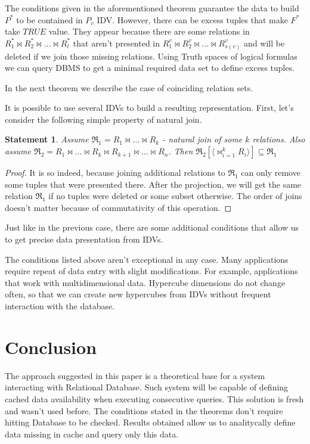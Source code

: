 \documentclass[preprint,12pt]{elsarticle}
\newtheorem{statement}{Statement}
\def \n #1{\mathit{#1}}
\begin{document}


The conditions given in the aforementioned theorem guarantee the data to build
$P^{\ast}$ to be contained in $P_v$ IDV. However, there can be excess tuples that
make $F^{\ast}$
take $\n{TRUE}$ value. They appear because there are some relations in
$R^{\ast}_1 \Join R^{\ast}_2\Join \dots \Join R^{\ast}_l $ that aren't
presented in $R^v_1 \Join R^v_2 \Join \dots \Join R^v_{s(v)} $ and will be
deleted if we join those missing relations. Using Truth spaces of logical
formulas we can query DBMS to get a minimal required data set to define excess
tuples.

In the next theorem we describe the case of coinciding relation sets.



It is possible to use several IDVs to build a resulting representation. First,
let's consider the following simple property of natural join.

\begin{statement}
Assume $\Re_1 = R_1 \Join \dots \Join R_k$ - natural join of some $k$ relations.
Also assume $\Re_2 = R_1 \Join \dots \Join R_k \Join R_{k+1} \Join \dots \Join
R_{n}$. Then $\Re_2 [\langle \Join_{i=1}^{k} R_i \rangle] \subseteq \Re_1$
\label{join_property}
\end{statement}
\begin{proof}
It is so indeed, because joining additional relations to $\Re_1$ can only
remove some tuples that were presented there. After the projection, we will get
the same relation $\Re_1$ if no tuples were deleted or some subset otherwise. The
order of joins doesn't matter because of commutativity of this operation.
\end{proof}



Just like in the previous case, there are some additional conditions that allow
us to get precise data presentation from IDVs.



The conditions listed above aren't exceptional in any case. Many applications
require repeat of data entry with slight modifications. For example,
applications that
work with multidimensional data. Hypercube dimensions do not change often, so
that we can create new hypercubes from IDVs without frequent interaction with
the database. 

\section{Conclusion}
The approach suggested in this paper is a theoretical base for a system
interacting with Relational Database. Such system will be capable of defining
cached data availability when executing consecutive queries. This solution is
fresh and wasn't used before. The conditions stated in the theorems don't
require hitting Database to be checked. Results obtained allow us to
analitycally define data missing in cache and query only this data.
\end{document}
